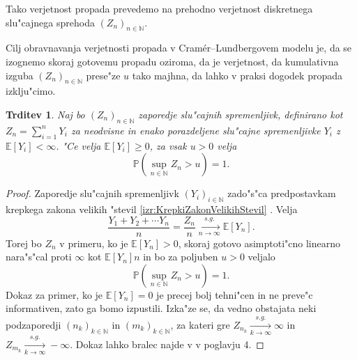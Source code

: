 \documentclass[12pt, a4paper, reqno]{amsart}
\theoremstyle{definition}
\theoremstyle{plain}
\newtheorem{trditev}[definicija]{Trditev}
\newcommand{\N}{\mathbb{N}}
\newcommand{\E}{\mathbb{E}}
\newcommand{\Prob}{\mathbb{P}}
\newcommand{\1}{\mathds{1}}
\newcommand*{\refPriloga}[1]{%
  \begingroup
    \hypersetup{
      linkcolor=red,
      linkbordercolor=red,
    }%
    \ref{#1}%
  \endgroup
}
\begin{document}
        Tako verjetnost propada prevedemo na prehodno verjetnost diskretnega slu"cajnega 
        sprehoda $(Z_n)_{n\in\N}$.
        
        Cilj obravnavanja verjetnosti propada v 
        Cramér--Lundbergovem modelu je, da se izognemo skoraj gotovemu propadu oziroma, da je verjetnost, 
        da kumulativna izguba $(Z_n)_{n\in\N}$ prese"ze $u$
        tako majhna, da lahko v praksi dogodek propada izklju"cimo. 

        \begin{trditev}
            Naj bo $(Z_n)_{n\in\N}$ zaporedje slu"cajnih spremenljivk, definirano kot 
            $Z_n = \sum_{i=1}^nY_i$ za neodvisne in enako porazdeljene slu"cajne spremenljivke 
            $Y_i$ z $\E\left[Y_i\right] < \infty$. 
            "Ce velja $\E\left[Y_i\right] \geq 0$, za vsak $u>0$ velja
            \begin{equation*}
                \Prob\left(\sup_{n\in\N}Z_n > u\right) = 1.
            \end{equation*}
            \label{trd:propadZVerjetnostjo1}
        \end{trditev}

        \begin{proof}
            Zaporedje slu"cajnih spremenljivk $(Y_i)_{i\in\N}$ zado"s"ca predpostavkam krepkega zakona
            velikih "stevil \refPriloga{izr:KrepkiZakonVelikihStevil}. Velja
            \begin{equation*}
                \frac{Y_1 + Y_2 + \cdots Y_n}{n} = \frac{Z_n}{n} \xrightarrow[n\to\infty]{s.g.} \E\left[Y_n\right].
            \end{equation*}
            Torej bo $Z_n$ v primeru, ko je $\E\left[Y_n\right]>0$, 
             skoraj gotovo asimptoti"cno linearno nara"s"cal proti $\infty$ kot $\E\left[Y_n\right] n$ in 
             bo za poljuben $u>0$ veljalo 
            \begin{equation*}
                \Prob\left(\sup_{n\in\N}Z_n > u\right) = 1.
            \end{equation*}
            Dokaz za primer, ko je $\E\left[Y_n\right] = 0$ je precej bolj tehni"cen in ne preve"c informativen, zato 
            ga bomo izpustili. Izka"ze se, da vedno obstajata neki podzaporedji $(n_k)_{k\in\N}$ in $(m_k)_{k\in\N}$, 
            za kateri gre
            $Z_{n_k} \xrightarrow[k\to\infty]{s.g.}\infty$ in 
            $Z_{m_k} \xrightarrow[k\to\infty]{s.g.}-\infty$.
            Dokaz lahko bralec najde v \cite{6} v poglavju 4.
        \end{proof}
\end{document}
